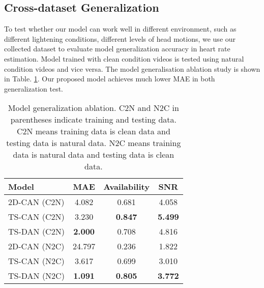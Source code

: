 \documentclass[conference]{IEEEtran}
\begin{document}
\subsection{Cross-dataset Generalization}
To test whether our model can work well in different environment, such as different lightening conditions, different levels of head motions, we use our collected dataset to evaluate model generalization accuracy in heart rate estimation. Model trained with clean condition videos is tested using natural condition videos and vice versa. The model generalisation ablation study is shown in Table. \ref{generalization}. Our proposed model achieves much lower MAE in both generalization test.
\begin{table}[htbp]
\caption{Model generalization ablation. C2N and N2C in parentheses indicate training and testing data. C2N means training data is clean data and testing data is natural data. N2C means training data is natural data and testing data is clean data.}
\begin{center}
\centering
\begin{tabular}{lccc}\hline
  Model & MAE & Availability & SNR\\ \hline
2D-CAN \cite{chen2018deepphys} (C2N)    &4.082 & 0.681 & 4.058 \\  
TS-CAN \cite{liu2020multi}(C2N)    &3.230 & \textbf{0.847} & \textbf{5.499}\\  
TS-DAN (C2N)    &\textbf{2.000} & 0.708& 4.816\\ \hline
2D-CAN \cite{chen2018deepphys} (N2C)    &24.797 & 0.236 & 1.822 \\ 
TS-CAN \cite{liu2020multi}(N2C)    &3.617 & 0.699& 3.010 \\ 
TS-DAN (N2C)    &\textbf{1.091} & \textbf{0.805}& \textbf{3.772}\\ \hline
\end{tabular}
\end{center}
\label{generalization}
\end{table}
\end{document}
